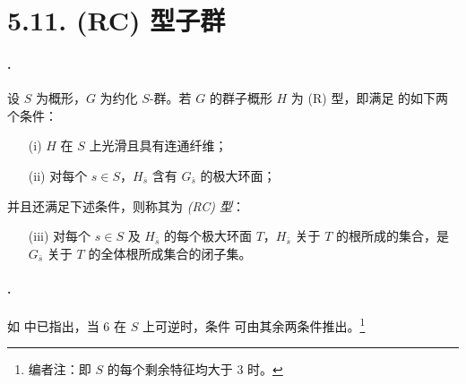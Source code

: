 \section*{5.11. \textup{(RC)} 型子群}

\paragraph{.}
设 \(S\) 为概形，\(G\) 为约化 \(S\)-群。若 \(G\) 的群子概形 \(H\) 为 \textup{(R)} 型，即满足  的如下两个条件：
\begin{enumerate}
\item[\textup{(i)}] \(H\) 在 \(S\) 上光滑且具有连通纤维；

\item[\textup{(ii)}] 对每个 \(s\in S\)，\(H_{\bar s}\) 含有 \(G_{\bar s}\) 的极大环面；
\end{enumerate}
并且还满足下述条件，则称其为 \emph{\textup{(RC)} 型}：
\begin{enumerate}
\item[\textup{\SGAInlineRefTarget{sga3:xxii:def:5.11.1:item:iii}(iii)}] 对每个 \(s\in S\) 及 \(H_{\bar s}\) 的每个极大环面 \(T\)，\(H_{\bar s}\) 关于 \(T\) 的根所成的集合，是 \(G_{\bar s}\) 关于 \(T\) 的全体根所成集合的闭子集。
\end{enumerate}

\paragraph{.}
如  中已指出，当 \(6\) 在 \(S\) 上可逆时，条件 \textup{} 可由其余两条件推出。\footnote{编者注：即 \(S\) 的每个剩余特征均大于 \(3\) 时。}

